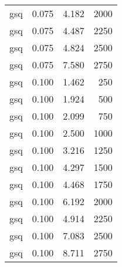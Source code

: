 \begin{table}
\begin{tabular}{lrrr}
gsq & 0.075 & 4.182 & 2000 \\
gsq & 0.075 & 4.487 & 2250 \\
gsq & 0.075 & 4.824 & 2500 \\
gsq & 0.075 & 7.580 & 2750 \\
gsq & 0.100 & 1.462 & 250 \\
gsq & 0.100 & 1.924 & 500 \\
gsq & 0.100 & 2.099 & 750 \\
gsq & 0.100 & 2.500 & 1000 \\
gsq & 0.100 & 3.216 & 1250 \\
gsq & 0.100 & 4.297 & 1500 \\
gsq & 0.100 & 4.468 & 1750 \\
gsq & 0.100 & 6.192 & 2000 \\
gsq & 0.100 & 4.914 & 2250 \\
gsq & 0.100 & 7.083 & 2500 \\
gsq & 0.100 & 8.711 & 2750 \\
\bottomrule
\end{tabular}
\end{table}
